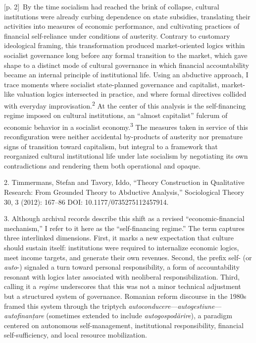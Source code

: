 \documentclass[10pt,a4paper]{article}
\begin{document}
{\scriptsize\color{gray} [p. 2]}\ By the time socialism had reached the brink of collapse, cultural institutions were already curbing dependence on state subsidies, translating their activities into measures of economic performance, and cultivating practices of financial self-reliance under conditions of austerity. Contrary to customary ideological framing, this transformation produced market-oriented logics within socialist governance long before any formal transition to the market, which gave shape to a distinct mode of cultural governance in which financial accountability became an internal principle of institutional life. Using an abductive approach, I trace moments where socialist state-planned governance and capitalist, market-like valuation logics intersected in practice, and where formal directives collided with everyday improvisation.\nobreak\textsuperscript{2} At the center of this analysis is the self-financing regime imposed on cultural institutions, an “almost capitalist” fulcrum of economic behavior in a socialist economy.\nobreak\textsuperscript{3} The measures taken in service of this reconfiguration were neither accidental by-products of austerity nor premature signs of transition toward capitalism, but integral to a framework that reorganized cultural institutional life under late socialism by negotiating its own contradictions and rendering them both operational and opaque.\par{\small 2. Timmermans, Stefan and Tavory, Iddo, “Theory Construction in Qualitative Research: From Grounded Theory to Abductive Analysis,” Sociological Theory 30, 3 (2012): 167–86 DOI: 10.1177/0735275112457914.\par}{\small 3. Although archival records describe this shift as a revised “economic-financial mechanism,” I refer to it here as the “self-financing regime.” The term captures three interlinked dimensions. First, it marks a new expectation that culture should sustain itself: institutions were required to internalize economic logics, meet income targets, and generate their own revenues. Second, the prefix self- (or \textit{auto}-) signaled a turn toward personal responsibility, a form of accountability resonant with logics later associated with neoliberal responsibilization. Third, calling it a \textit{regime} underscores that this was not a minor technical adjustment but a structured system of governance. Romanian reform discourse in the 1980s framed this system through the triptych \textit{autoconducere}—\textit{autogestiune}—\textit{autofinanțare} (sometimes extended to include \textit{autogospodărire}), a paradigm centered on autonomous self-management, institutional responsibility, financial self-sufficiency, and local resource mobilization.\par}
\end{document}
